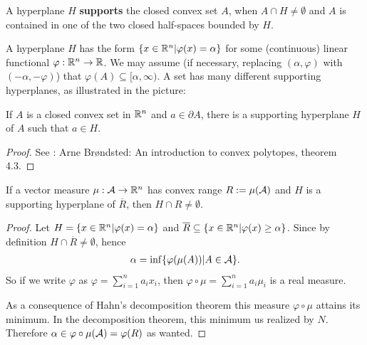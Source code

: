 \documentclass[../../main.tex]{subfiles}
\begin{document}
\begin{definition}
A hyperplane $H$ \textbf{supports} the closed convex set $A$, when $A\cap H\neq \emptyset$ and $A$ is contained in one of the two closed half-spaces bounded by $H$.

A hyperplane $H$ has the form $\{x\in \mathbb{R}^{n}|\varphi(x) = \alpha \}$ for some (continuous) linear functional $\varphi: \mathbb{R}^{n} \to \mathbb{R}$. We may assume (if necessary, replacing $(\alpha, \varphi)$ with $(-\alpha, -\varphi)$) that $\varphi(A)\subseteq [\alpha, \infty)$.
A set has many different supporting hyperplanes, as illustrated in the picture:
\begin{center}
\end{center}
\end{definition}

\begin{theorem}\label{thm: hyperplane}
If $A$ is a closed convex set in $\mathbb{R}^{n}$ and $a\in \partial A$, there is a supporting hyperplane $H$ of $A$ such that $a\in H$.
\end{theorem}
\begin{proof}
See \cite{Brondsted82}: Arne Brøndsted: An introduction to convex polytopes, theorem 4.3.
\end{proof}

\begin{lemma}\label{lem: non-empty hyperplane cap}
If a vector measure $\mu:\mathcal{A}\to \mathbb{R}^{n}$ has convex range $R:=\mu(\mathcal{A})$ and $H$ is a supporting hyperplane of $\overline{R}$, then $H\cap R \neq \emptyset$.
\end{lemma}
\begin{proof}
Let $H=\{x\in \mathbb{R}^{n} | \varphi(x) = \alpha \}$ and $\overline{R}\subseteq \{x\in \mathbb{R}^{n} | \varphi(x) \ge \alpha\}$. Since by definition $H\cap \overline{R}\neq \emptyset$, hence
\begin{align*}
	\alpha=\inf\{ \varphi(\mu(A)) | A \in \mathcal{A} \}.
\end{align*}
So if we write $\varphi$ as $\varphi=\sum_{i=1}^{n}a_{i}x_{i}$, then $\varphi\circ\mu=\sum_{i=1}^{n}a_{i}\mu_{i}$ is a real measure.

As a consequence of Hahn's decomposition theorem this measure $\varphi \circ \mu$ attains its minimum. In the decomposition theorem, this minimum us realized by $N$.
Therefore $\alpha\in \varphi\circ \mu(\mathcal{A})=\varphi(R)$ as wanted.
\end{proof}
\end{document}
